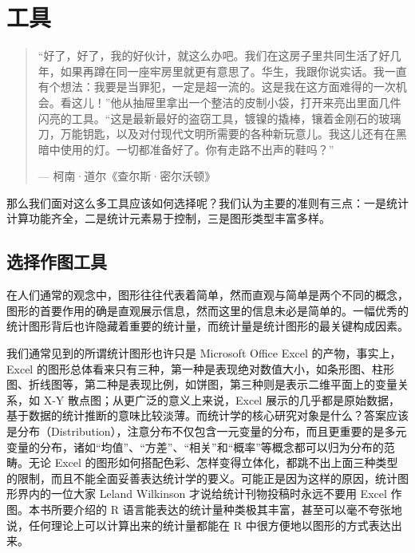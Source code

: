 \documentclass[
  b5paper,
  UTF8,twoside]{book}
\begin{document}
\hypertarget{cha:tools}{%
\chapter{工具}\label{cha:tools}}

\begin{quote}
``好了，好了，我的好伙计，就这么办吧。我们在这房子里共同生活了好几年，如果再蹲在同一座牢房里就更有意思了。华生，我跟你说实话。我一直有个想法：我要是当罪犯，一定是超一流的。这是我在这方面难得的一次机会。看这儿！''他从抽屉里拿出一个整洁的皮制小袋，打开来亮出里面几件闪亮的工具。``这是最新最好的盗窃工具，镀镍的撬棒，镶着金刚石的玻璃刀，万能钥匙，以及对付现代文明所需要的各种新玩意儿。我这儿还有在黑暗中使用的灯。一切都准备好了。你有走路不出声的鞋吗？''

\hspace*{\fill} --- 柯南·道尔《查尔斯·密尔沃顿》
\end{quote}

那么我们面对这么多工具应该如何选择呢？我们认为主要的准则有三点：一是统计计算功能齐全，二是统计元素易于控制，三是图形类型丰富多样。

\hypertarget{ux9009ux62e9ux4f5cux56feux5de5ux5177}{%
\section{选择作图工具}\label{ux9009ux62e9ux4f5cux56feux5de5ux5177}}

在人们通常的观念中，图形往往代表着简单，然而直观与简单是两个不同的概念，图形的首要作用的确是直观展示信息，然而这里的信息未必是简单的。一幅优秀的统计图形背后也许隐藏着重要的统计量，而统计量是统计图形的最关键构成因素。

我们通常见到的所谓统计图形也许只是 Microsoft Office Excel 的产物，事实上，Excel 的图形总体看来只有三种，第一种是表现绝对数值大小，如条形图、柱形图、折线图等，第二种是表现比例，如饼图，第三种则是表示二维平面上的变量关系，如 X-Y 散点图；从更广泛的意义上来说，Excel 展示的几乎都是原始数据，基于数据的统计推断的意味比较淡薄。而统计学的核心研究对象是什么？答案应该是分布（Distribution），注意分布不仅包含一元变量的分布，而且更重要的是多元变量的分布，诸如``均值''、``方差''、``相关''和``概率''等概念都可以归为分布的范畴。无论 Excel 的图形如何搭配色彩、怎样变得立体化，都跳不出上面三种类型的限制，而且不能全面妥善表达统计学的要义。可能正是因为这样的原因，统计图形界内的一位大家 Leland Wilkinson 才说给统计刊物投稿时永远不要用 Excel 作图。本书所要介绍的 R 语言能表达的统计量种类极其丰富，甚至可以毫不夸张地说，任何理论上可以计算出来的统计量都能在 R 中很方便地以图形的方式表达出来。
\end{document}
